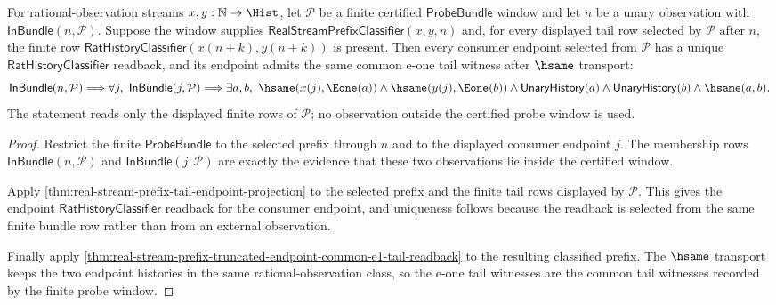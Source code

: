 \begin{theorem}
\label{thm:real-stream-prefix-probe-endpoint-determinacy}
For rational-observation streams $x,y:\mathbb{N}\to\Hist$, let
$\mathcal P$ be a finite certified $\mathsf{ProbeBundle}$ window and let
$n$ be a unary observation with $\mathsf{InBundle}(n,\mathcal P)$. Suppose the
window supplies $\mathsf{RealStreamPrefixClassifier}(x,y,n)$ and, for every
displayed tail row selected by $\mathcal P$ after $n$, the finite row
$\mathsf{RatHistoryClassifier}(x(n+k),y(n+k))$ is present. Then every consumer
endpoint selected from $\mathcal P$ has a unique
$\mathsf{RatHistoryClassifier}$ readback, and its endpoint admits the same
common e-one tail witness after $\hsame$ transport:
$$
\mathsf{InBundle}(n,\mathcal P)\Longrightarrow
\forall j,\ \mathsf{InBundle}(j,\mathcal P)\Longrightarrow
\exists a,b,\ \hsame(x(j),\Eone(a))\land \hsame(y(j),\Eone(b))\land
\mathsf{UnaryHistory}(a)\land \mathsf{UnaryHistory}(b)\land \hsame(a,b).
$$
The statement reads only the displayed finite rows of $\mathcal P$; no
observation outside the certified probe window is used.
\end{theorem}
\begin{proof}
Restrict the finite $\mathsf{ProbeBundle}$ to the selected prefix through $n$
and to the displayed consumer endpoint $j$. The membership rows
$\mathsf{InBundle}(n,\mathcal P)$ and $\mathsf{InBundle}(j,\mathcal P)$ are
exactly the evidence that these two observations lie inside the certified
window.

Apply \autoref{thm:real-stream-prefix-tail-endpoint-projection} to the selected
prefix and the finite tail rows displayed by $\mathcal P$. This gives the
endpoint $\mathsf{RatHistoryClassifier}$ readback for the consumer endpoint,
and uniqueness follows because the readback is selected from the same finite
bundle row rather than from an external observation.

Finally apply
\autoref{thm:real-stream-prefix-truncated-endpoint-common-e1-tail-readback} to
the resulting classified prefix. The $\hsame$ transport keeps the two endpoint
histories in the same rational-observation class, so the e-one tail witnesses
are the common tail witnesses recorded by the finite probe window.
\end{proof}

